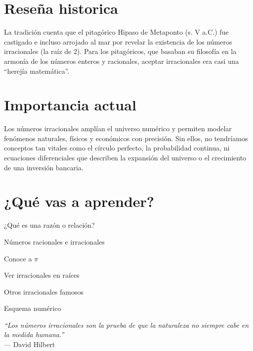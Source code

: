 
\vspace{1cm}

\vspace{1em}
\section*{Reseña historica}

\begin{reseñaplana}
La tradición cuenta que el pitagórico Hipaso de Metaponto (s. V a.C.) fue castigado e incluso arrojado al 
mar por revelar la existencia de los números irracionales (la raíz de 2). Para los pitagóricos, que basaban su filosofía 
en la armonía de los números enteros y racionales, aceptar irracionales era casi una “herejía matemática”.
\end{reseñaplana}

\section*{Importancia actual}

\begin{reseñaplana}
Los números irracionales amplían el universo numérico y permiten modelar fenómenos naturales, 
físicos y económicos con precisión.  Sin ellos, no tendríamos conceptos tan vitales como el círculo perfecto, 
la probabilidad continua, ni ecuaciones diferenciales que describen la expansión del universo o el crecimiento de una inversión bancaria.
\end{reseñaplana}

\section*{¿Qué vas a aprender?}
\begin{aprende}
  \item ¿Qué es una razón o relación?
  \item Números racionales e irracionales
  \item Conoce a $\pi$
  \item Ver irracionales en raíces
  \item Otros irracionales famosos
  \item Esquema numérico
\end{aprende}

\vspace{1cm}
\begin{flushright}
  {\oneptup\itshape ``Los números irracionales son la prueba de que la naturaleza no siempre cabe en la medida humana.''}\\
  {\oneptup — David Hilbert}
\end{flushright}











